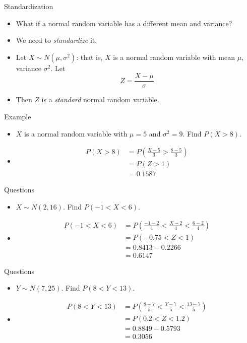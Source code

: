 \documentclass[10pt, handout, xcolor=table]{beamer}
\begin{document}
\begin{frame}{Standardization}
\begin{itemize}
\setlength{\itemsep}{20pt}
\item<1-> What if a normal random variable has a different mean and variance?
\item<2-> We need to \emph{standardize} it. 
\item<3-> Let $X \sim N(\mu, \sigma^2)$: that is, $X$ is a normal random variable with mean $\mu$, variance $\sigma^2$. Let
$$Z = \frac{X - \mu}{\sigma}$$
\item<4-> Then $Z$ is a \emph{standard} normal random variable.
\end{itemize}
\end{frame}

\begin{frame}{Example}
\begin{itemize}
\item<1-> $X$ is a normal random variable with $\mu = 5$ and $\sigma^2 = 9$. Find $P(X > 8)$.
\item<2->[] {\color{red}
\begin{align*}
P(X > 8) &= P\left( \frac{X-5}{3} > \frac{8 - 5}{3}\right)\\
&= P(Z > 1) \\
&= 0.1587
\end{align*}}
\end{itemize}
\end{frame}

\begin{frame}{Questions}
\begin{itemize}
\item<1-> $X \sim N(2, 16)$. Find $P(-1 < X < 6)$.
\item<2->[] \color{red}
\begin{align*}
P(-1 < X < 6 ) &= P\left(\frac{-1-2}{4} < \frac{X - 2}{4} < \frac{6 - 2}{4}\right) \\
&= P(-0.75 < Z < 1) \\
&= 0.8413 - 0.2266 \\
&= 0.6147
\end{align*} 
\end{itemize}
\end{frame}

\begin{frame}{Questions}
\begin{itemize}
\item<1-> $Y \sim N(7, 25)$. Find $P(8 < Y < 13)$.
\item<2->[] \color{red}
\begin{align*}
P(8 < Y < 13 )&= P\left(\frac{8 - 7}{5} < \frac{Y -7}{5}< \frac{13 - 7}{5}\right) \\
&= P(0.2 < Z < 1.2)\\
&= 0.8849 - 0.5793 \\
&= 0.3056
\end{align*}
\end{itemize}
\end{frame}
\end{document}

